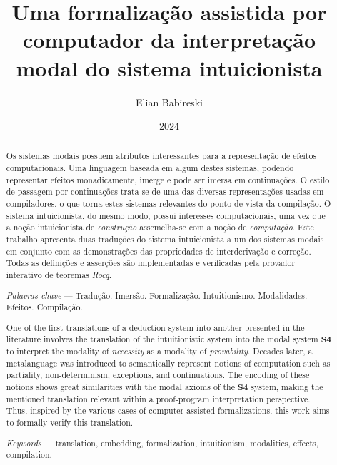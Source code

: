 


    \title{Uma formalização assistida por computador da interpretação modal do sistema intuicionista}
    \author{Elian Babireski}
    \date{2024}

    \maketitle

    
    
    

    \begin{abstract}
        Os sistemas modais possuem atributos interessantes para a representação de efeitos computacionais.
        Uma linguagem baseada em algum destes sistemas, podendo representar efeitos monadicamente, imerge e pode ser imersa em continuações.
        O estilo de passagem por continuações trata-se de uma das diversas representações usadas em compiladores, o que torna estes sistemas relevantes do ponto de vista da compilação.
        O sistema intuicionista, do mesmo modo, possui interesses computacionais, uma vez que a noção intuicionista de \emph{construção} assemelha-se com a noção de \emph{computação}.
        Este trabalho apresenta duas traduções do sistema intuicionista a um dos sistemas modais em conjunto com as demonstrações das propriedades de interderivação e correção.
        Todas as definições e asserções são implementadas e verificadas pela provador interativo de teoremas \emph{Rocq}.

        \textit{Palavras-chave} --- Tradução. Imersão. Formalização. Intuitionismo. Modalidades. Efeitos. Compilação.
    \end{abstract}

    \begin{otherlanguage}{english} 
        \begin{abstract}
            One of the first translations of a deduction system into another presented in the literature involves the translation of the intuitionistic system into the modal system $\mathbf{S4}$ to interpret the modality of \emph{necessity} as a modality of \emph{provability}. Decades later, a metalanguage was introduced to semantically represent notions of computation such as partiality, non-determinism, exceptions, and continuations. The encoding of these notions shows great similarities with the modal axioms of the $\mathbf{S4}$ system, making the mentioned translation relevant within a proof-program interpretation perspective. Thus, inspired by the various cases of computer-assisted formalizations, this work aims to formally verify this translation.

            \textit{Keywords} --- translation, embedding, formalization, intuitionism, modalities, effects, compilation.
        \end{abstract}
    \end{otherlanguage}


